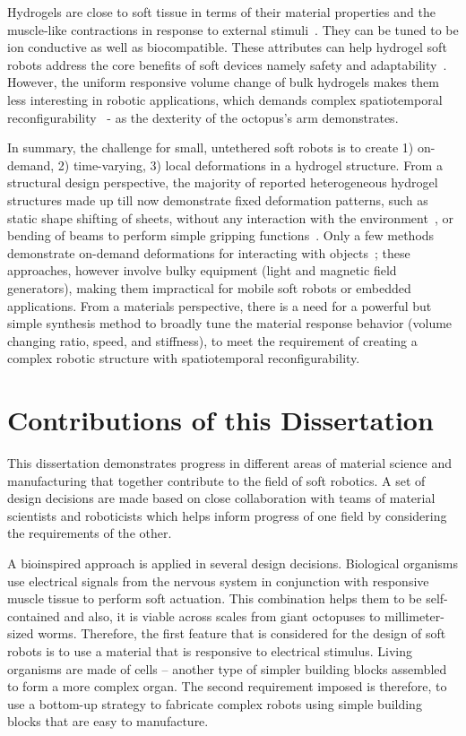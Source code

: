 Hydrogels are close to soft tissue in terms of their material properties and the muscle-like contractions in response to external stimuli~\cite{Liu2020}. They can be tuned to be ion conductive as well as biocompatible. These attributes can help hydrogel soft robots address the core benefits of soft devices namely safety and adaptability~\cite{Lee2020}. However, the uniform responsive volume change of bulk hydrogels makes them less interesting in robotic applications, which demands complex spatiotemporal reconfigurability~\cite{Erol2019} - as the dexterity of the octopus's arm demonstrates. 

In summary, the challenge for small, untethered soft robots is to create 1) on-demand, 2) time-varying, 3) local deformations in a hydrogel structure. From a structural design perspective, the majority of reported heterogeneous hydrogel structures made up till now demonstrate fixed deformation patterns, such as static shape shifting of sheets, without any interaction with the environment~\cite{SydneyGladman2016, Ma2019, Jeon2017}, or bending of beams to perform simple gripping functions~\cite{Wang2017, Ma2018, Duan2017}. Only a few methods demonstrate on-demand deformations for interacting with objects~\cite{Mourran2017, Palagi2016, Kim2018}; these approaches, however involve bulky equipment (light and magnetic field generators), making them impractical for mobile soft robots or embedded applications.
From a materials perspective, there is a need for a powerful but simple synthesis method to broadly tune the material response behavior (volume changing ratio, speed, and stiffness), to meet the requirement of creating a complex robotic structure with spatiotemporal reconfigurability.

\section{Contributions of this Dissertation}
This dissertation demonstrates progress in different areas of material science and manufacturing  that together contribute to the field of soft robotics. A set of design decisions are made based on close collaboration with teams of material scientists and roboticists which helps inform progress of one field by considering the requirements of the other. 

A bioinspired approach is applied in several design decisions. Biological organisms use electrical signals from the nervous system in conjunction with responsive muscle tissue to perform soft actuation. This combination helps them to be self-contained and also, it is viable across scales from giant octopuses to millimeter-sized worms. Therefore, the first feature that is considered for the design of soft robots is to use a material that is responsive to electrical stimulus. Living organisms are made of cells -- another type of simpler building blocks assembled to form a more complex organ. The second requirement imposed is therefore, to use a bottom-up strategy to fabricate complex robots using simple building blocks that are easy to manufacture. 

